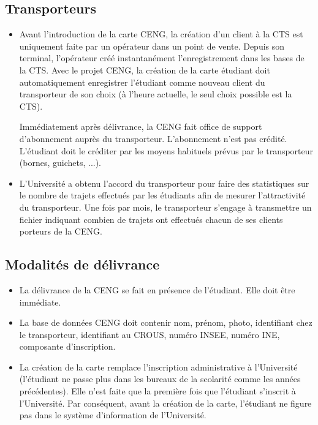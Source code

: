 \documentclass[12pt]{article}
\begin{document}
\subsection{Transporteurs}
\begin{itemize}
\item 
Avant l'introduction de la carte CENG, la création d'un client à la CTS est uniquement faite par un opérateur 
dans un point de vente. Depuis son terminal, l'opérateur créé instantanément l'enregistrement dans les 
bases de la CTS. 
Avec le projet CENG, la création de la carte étudiant doit automatiquement enregistrer l'étudiant comme nouveau
client du transporteur de son choix (à l'heure actuelle, le seul choix possible est la CTS).

Immédiatement après délivrance, la CENG fait office de support d'abonnement auprès du transporteur.
L'abonnement n'est pas crédité. L'étudiant doit le créditer par les moyens habituels prévus par le
transporteur (bornes, guichets, ...). 


\item  L'Université a obtenu l'accord du transporteur pour faire des statistiques sur le nombre de trajets 
      effectués par les étudiants afin de mesurer l'attractivité du transporteur.
	 Une fois par mois, le transporteur s'engage à transmettre un fichier indiquant combien de trajets
	 ont effectués chacun de ses clients porteurs de la CENG.

\end{itemize}



\subsection{Modalités de délivrance}
\begin{itemize}
\item 
La délivrance de la CENG se fait en présence de l'étudiant. Elle doit être immédiate.

\item 
La base de données CENG doit contenir nom, prénom, photo, 
identifiant chez le transporteur, identifiant au CROUS, numéro INSEE, 
numéro INE, composante d'inscription.

\item
La création de la carte remplace l'inscription administrative à l'Université
(l'étudiant ne passe plus dans les bureaux de la scolarité comme les années précédentes).
Elle n'est faite que la première fois que l'étudiant s'inscrit à l'Université.
Par conséquent, avant la création de la carte, l'étudiant ne figure pas dans
le système d'information de l'Université.

\end{itemize}
\end{document}
